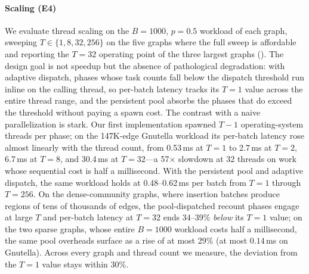 \paragraph{Scaling (E4)}
\label{par:scaling}
We evaluate thread scaling on the $B{=}1000$, $p{=}0.5$ workload of each graph, sweeping $T\in\{1,8,32,256\}$ on the five graphs where the full sweep is affordable and reporting the $T{=}32$ operating point of the three largest graphs ().
The design goal is not speedup but the absence of pathological degradation: with adaptive dispatch, phases whose task counts fall below the dispatch threshold run inline on the calling thread, so per-batch latency tracks its $T{=}1$ value across the entire thread range, and the persistent pool absorbs the phases that do exceed the threshold without paying a spawn cost.
The contrast with a naive parallelization is stark.
Our first implementation spawned $T{-}1$ operating-system threads per phase; on the 147K-edge Gnutella workload its per-batch latency rose almost linearly with the thread count, from 0.53\,ms at $T{=}1$ to 2.7\,ms at $T{=}2$, 6.7\,ms at $T{=}8$, and 30.4\,ms at $T{=}32$---a 57$\times$ slowdown at 32 threads on work whose sequential cost is half a millisecond.
With the persistent pool and adaptive dispatch, the same workload holds at 0.48--0.62\,ms per batch from $T{=}1$ through $T{=}256$.
On the dense-community graphs, where insertion batches produce regions of tens of thousands of edges, the pool-dispatched recount phases engage at large $T$ and per-batch latency at $T{=}32$ ends 34--39\% \emph{below} its $T{=}1$ value; on the two sparse graphs, whose entire $B{=}1000$ workload costs half a millisecond, the same pool overheads surface as a rise of at most 29\% (at most $0.14$\,ms on Gnutella).
Across every graph and thread count we measure, the deviation from the $T{=}1$ value stays within 30\%.

\begin{table}[tb]
\caption{Thread scaling on the $B{=}1000$, $p{=}0.5$ workload (ms/batch, mean of five runs, three on YouTube, LiveJournal, and Skitter; the three largest graphs report the $T{=}32$ operating point only, as marked by dashes; $T{=}256$ deliberately oversubscribes the 32-core socket).}
\label{tab:scaling}

\end{table}

